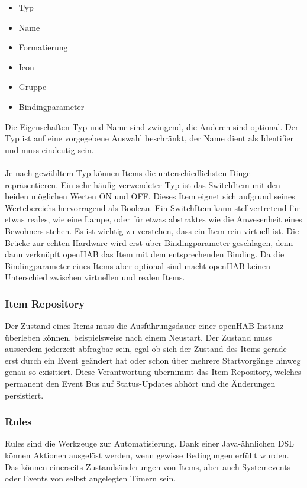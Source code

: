 \begin{itemize}
	\item Typ
	\item Name
	\item Formatierung
	\item Icon
	\item Gruppe
	\item Bindingparameter
\end{itemize}

Die Eigenschaften Typ und Name sind zwingend, die Anderen sind optional. Der Typ ist auf eine vorgegebene Auswahl beschränkt, der Name dient als Identifier und muss eindeutig sein.\\
\\
Je nach gewähltem Typ können Items die unterschiedlichsten Dinge repräsentieren. Ein sehr häufig verwendeter Typ ist das SwitchItem mit den beiden möglichen Werten ON und OFF. Dieses Item eignet sich aufgrund seines Wertebereichs hervorragend als Boolean. Ein SwitchItem kann stellvertretend für etwas reales, wie eine Lampe, oder für etwas abstraktes wie die Anwesenheit eines Bewohners stehen. Es ist wichtig zu verstehen, dass ein Item rein virtuell ist. Die Brücke zur echten Hardware wird erst über Bindingparameter geschlagen, denn dann verknüpft openHAB das Item mit dem entsprechenden Binding. Da die Bindingparameter eines Items aber optional sind macht openHAB keinen Unterschied zwischen virtuellen und realen Items.


\subsubsection{Item Repository}
Der Zustand eines Items muss die Ausführungsdauer einer openHAB Instanz überleben können, beispielsweise nach einem Neustart. Der Zustand muss ausserdem jederzeit abfragbar sein, egal ob sich der Zustand des Items gerade erst durch ein Event geändert hat oder schon über mehrere Startvorgänge hinweg genau so exisitiert. Diese Verantwortung übernimmt das Item Repository, welches permanent den Event Bus auf Status-Updates abhört und die Änderungen persistiert.

\subsubsection{Rules}
Rules sind die Werkzeuge zur Automatisierung. Dank einer Java-ähnlichen DSL können Aktionen ausgelöst werden, wenn gewisse Bedingungen erfüllt wurden. Das können einerseits Zustandsänderungen von Items, aber auch Systemevents oder Events von selbst angelegten Timern sein. 

